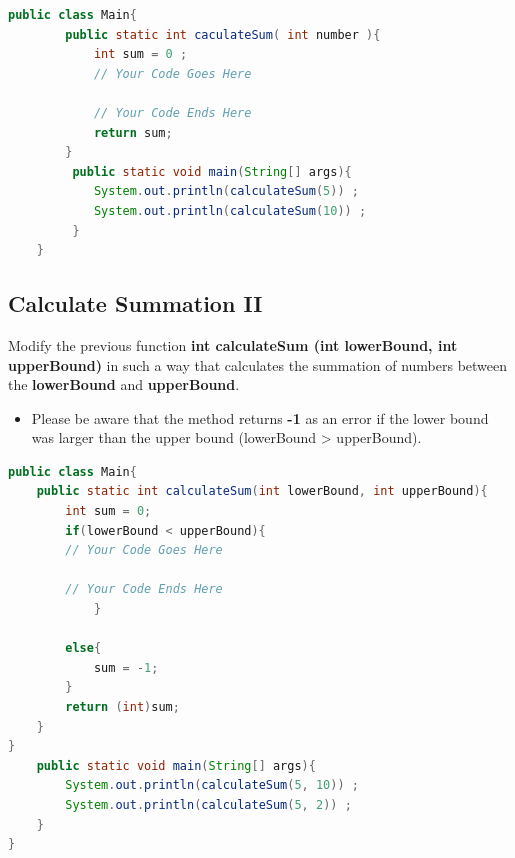 \documentclass[12pt , a4paper]{article}
\begin{document}
	\begin{lstlisting}[language=Java]
	public class Main{
		public static int caculateSum( int number ){
			int sum = 0 ;
			// Your Code Goes Here

			// Your Code Ends Here
			return sum;
		}
	     public static void main(String[] args){
			System.out.println(calculateSum(5)) ;
			System.out.println(calculateSum(10)) ;
	     }
	}
	\end{lstlisting}

	\newpage
	\subsection{Calculate Summation II}
	Modify the previous function \textbf{int calculateSum (int lowerBound, int upperBound)} in such a way that calculates the summation of numbers between the \textbf{lowerBound} and \textbf{upperBound}.\\

	\begin{importantBox}

		\begin{itemize}
			\item  Please be aware that the method returns \textbf{-1} as an error if the lower bound was larger than the upper bound (lowerBound > upperBound).
		\end{itemize}
	\end{importantBox}


	\begin{lstlisting}[language=Java]
public class Main{
	public static int calculateSum(int lowerBound, int upperBound){
		int sum = 0;
		if(lowerBound < upperBound){
		// Your Code Goes Here

		// Your Code Ends Here
        	}

		else{
			sum = -1;
		}
		return (int)sum;
	}
}
	public static void main(String[] args){
		System.out.println(calculateSum(5, 10)) ;
		System.out.println(calculateSum(5, 2)) ;
	}
}
	\end{lstlisting}
\end{document}

